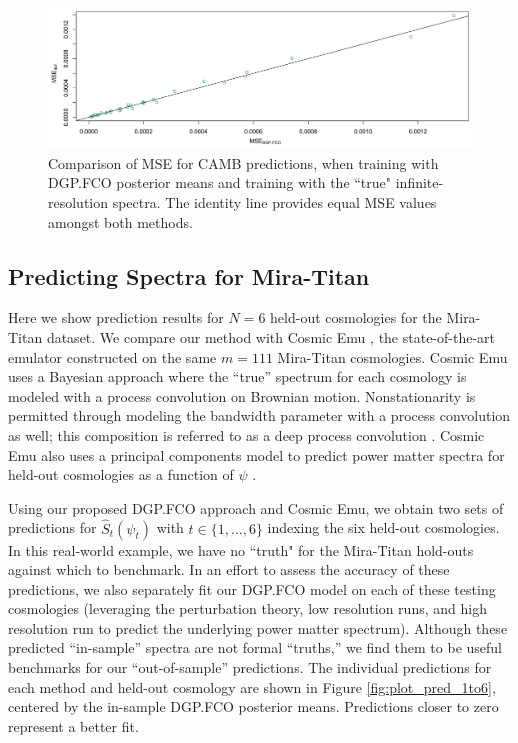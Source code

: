 \documentclass[11pt]{article}
\begin{document}
\begin{figure}
    \centering
    \includegraphics[width=\textwidth]{mse_dot.jpeg}
    \caption{Comparison of MSE for CAMB predictions, when training with DGP.FCO posterior 
             means and training with the ``true" infinite-resolution spectra. The identity line 
             provides equal MSE values amongst both methods.}   
    \label{fig:mse_camb}
\end{figure}

\subsection{Predicting Spectra for Mira-Titan}
\label{subsec:mira_pred}

Here we show prediction results for $N=6$ held-out cosmologies for the Mira-Titan dataset. 
We compare our method with Cosmic Emu \citep{moran2023mira}, the state-of-the-art emulator 
constructed on the same $m=111$ Mira-Titan cosmologies. Cosmic Emu uses a Bayesian approach 
where the ``true'' spectrum for each cosmology is modeled with a process convolution on Brownian motion. 
Nonstationarity is permitted through modeling the bandwidth parameter with a process 
convolution as well; this composition is referred to as a deep process convolution 
\citep[DPC;][]{moran2023mira}. Cosmic Emu also uses a principal components model to predict power matter 
spectra for held-out cosmologies as a function of $\psi$ \citep{gattiker2020sepia}.

Using our proposed DGP.FCO approach and Cosmic Emu, we obtain two sets of predictions for $\hat{S}_t(\psi_t)$ 
with $t\in\{1,\ldots,6\}$ indexing the six held-out cosmologies.  In this real-world example, we have
no ``truth" for the Mira-Titan hold-outs against which to benchmark. In an effort to assess the 
accuracy of these predictions, we also separately fit our DGP.FCO model on each of these testing cosmologies
(leveraging the perturbation theory, low resolution runs, and high resolution run to predict the underlying
power matter spectrum).  Although these predicted ``in-sample'' spectra are not formal ``truths,'' we find them to be
useful benchmarks for our ``out-of-sample'' predictions.  The individual predictions for each method and 
held-out cosmology are shown in Figure \ref{fig:plot_pred_1to6}, centered by the in-sample DGP.FCO
posterior means.  Predictions closer to zero represent a better fit. 
\end{document}
